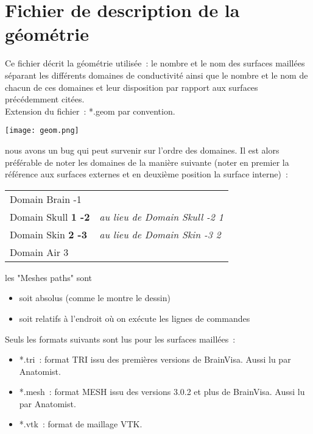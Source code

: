 \section{Fichier de description de la géométrie}
\label{sect: annexe 1}

\noindent
Ce fichier décrit la géométrie utilisée~: le nombre et le nom des surfaces maillées séparant les différents domaines de
conductivité ainsi que le nombre et le nom de chacun de ces domaines et leur disposition par rapport aux surfaces précédemment
citées.\\ 
Extension du fichier~: *.geom par convention. 

\centerline{\texttt{[image: geom.png]}}

\begin{note}
    nous avons un bug qui peut survenir sur l'ordre des domaines. Il est alors préférable de noter les domaines de la manière
    suivante (noter en premier la référence aux surfaces externes et en deuxième position la surface interne)~:

    \begin{tabular}{ll}
        Domain Brain -1              & \\
        Domain Skull \textbf{1 -2}	 &	\emph{au lieu de Domain Skull -2 1} \\
        Domain Skin \textbf{2 -3}	 &	\emph{au lieu de Domain Skin -3 2}  \\
        Domain Air 3                 &  \\
    \end{tabular}
\end{note}

\medskip

\begin{note}
    les "Meshes paths" sont 
    \begin{itemize}
        \item soit absolus (comme le montre le dessin)
        \item soit relatifs à l'endroit où on exécute les lignes de commandes 
    \end{itemize}
    Seuls les formats suivants sont lus pour les surfaces maillées~:
    \begin{itemize}
        \item *.tri~: format TRI issu des premières versions de BrainVisa. Aussi lu par Anatomist.
        \item *.mesh~: format MESH issu des versions 3.0.2 et plus de BrainVisa. Aussi lu par Anatomist.
        \item *.vtk~: format de maillage VTK.
    \end{itemize}
\end{note}


